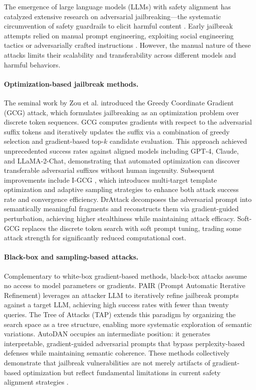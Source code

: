 ﻿\documentclass[lettersize,journal]{IEEEtran}
\begin{document}
The emergence of large language models (LLMs) with safety alignment has catalyzed extensive research on adversarial jailbreaking---the systematic circumvention of safety guardrails to elicit harmful content \cite{wang2023llm_security_survey_jsj, li2022adversarial_survey_rjb}. Early jailbreak attempts relied on manual prompt engineering, exploiting social engineering tactics or adversarially crafted instructions \cite{zeng2024persuasion}. However, the manual nature of these attacks limits their scalability and transferability across different models and harmful behaviors.

\paragraph{Optimization-based jailbreak methods.} The seminal work by Zou et al. \cite{zou2023universal} introduced the Greedy Coordinate Gradient (GCG) attack, which formulates jailbreaking as an optimization problem over discrete token sequences. GCG computes gradients with respect to the adversarial suffix tokens and iteratively updates the suffix via a combination of greedy selection and gradient-based top-$k$ candidate evaluation. This approach achieved unprecedented success rates against aligned models including GPT-4, Claude, and LLaMA-2-Chat, demonstrating that automated optimization can discover transferable adversarial suffixes without human ingenuity. Subsequent improvements include I-GCG \cite{jia2024improved}, which introduces multi-target template optimization and adaptive sampling strategies to enhance both attack success rate and convergence efficiency. DrAttack \cite{ren2024drattack} decomposes the adversarial prompt into semantically meaningful fragments and reconstructs them via gradient-guided perturbation, achieving higher stealthiness while maintaining attack efficacy. Soft-GCG \cite{ren2024soft} replaces the discrete token search with soft prompt tuning, trading some attack strength for significantly reduced computational cost.

\paragraph{Black-box and sampling-based attacks.} Complementary to white-box gradient-based methods, black-box attacks assume no access to model parameters or gradients. PAIR (Prompt Automatic Iterative Refinement) \cite{chao2023jailbreaking} leverages an attacker LLM to iteratively refine jailbreak prompts against a target LLM, achieving high success rates with fewer than twenty queries. The Tree of Attacks (TAP) \cite{mehrotra2023tree} extends this paradigm by organizing the search space as a tree structure, enabling more systematic exploration of semantic variations. AutoDAN \cite{zhu2023autodan} occupies an intermediate position: it generates interpretable, gradient-guided adversarial prompts that bypass perplexity-based defenses while maintaining semantic coherence. These methods collectively demonstrate that jailbreak vulnerabilities are not merely artifacts of gradient-based optimization but reflect fundamental limitations in current safety alignment strategies \cite{liu2024llm_attack_defense_jsjy}.
\end{document}
